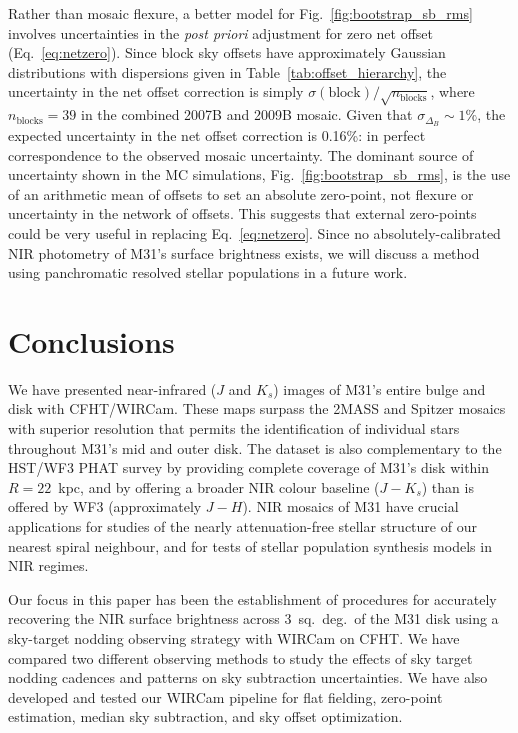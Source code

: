 \documentclass[iop]{emulateapj}
\newcommand{\Fig}[1]{Fig.~\ref{fig:#1}}  %
\newcommand{\Eq}[1]{Eq.~\ref{eq:#1}}  %
\newcommand{\Tab}[1]{Table~\ref{tab:#1}}  %
\begin{document}
Rather than mosaic flexure, a better model for \Fig{bootstrap_sb_rms} involves uncertainties in the \textit{post priori} adjustment for zero net offset (\Eq{netzero}).
Since block sky offsets have approximately Gaussian distributions with dispersions given in \Tab{offset_hierarchy}, the uncertainty in the net offset correction is simply $\sigma(\mathrm{block})/\sqrt{n_\mathrm{blocks}}$, where $n_\mathrm{blocks}=39$ in the combined 2007B and 2009B mosaic.
Given that $\sigma_{\Delta_B}\sim 1\%$, the expected uncertainty in the net offset correction is 0.16\%: in perfect correspondence to the observed mosaic uncertainty.
The dominant source of uncertainty shown in the MC simulations, \Fig{bootstrap_sb_rms}, is the use of an arithmetic mean of offsets to set an absolute zero-point, not flexure or uncertainty in the network of offsets.
This suggests that external zero-points could be very useful in replacing \Eq{netzero}.
Since no absolutely-calibrated NIR photometry of M31's surface brightness exists, we will discuss a method using panchromatic resolved stellar populations in a future work.

\section{Conclusions}
\label{sec:conclusions}

We have presented near-infrared ($J$ and $K_s$) images of M31's entire bulge and disk with CFHT/WIRCam.
These maps surpass the 2MASS \citep{Beaton:2007} and Spitzer \citep{Barmby:2006} mosaics with superior resolution that permits the identification of individual stars throughout M31's mid and outer disk.
The dataset is also complementary to the HST/WF3 PHAT survey \citep{Dalcanton:2012} by providing complete coverage of M31's disk within $R=22$~kpc, and by offering a broader NIR colour baseline ($J-K_s$) than is offered by WF3 (approximately $J-H$).
NIR mosaics of M31 have crucial applications for studies of the nearly attenuation-free stellar structure of our nearest spiral neighbour, and for tests of stellar population synthesis models in NIR regimes.

Our focus in this paper has been the establishment of procedures for accurately recovering the NIR surface brightness across 3~sq.~deg.\ of the M31 disk using a sky-target nodding observing strategy with WIRCam on CFHT\@.
We have compared two different observing methods to study the effects of sky target nodding cadences and patterns on sky subtraction uncertainties.
We have also developed and tested our WIRCam pipeline for flat fielding, zero-point estimation, median sky subtraction, and sky offset optimization.
\end{document}
